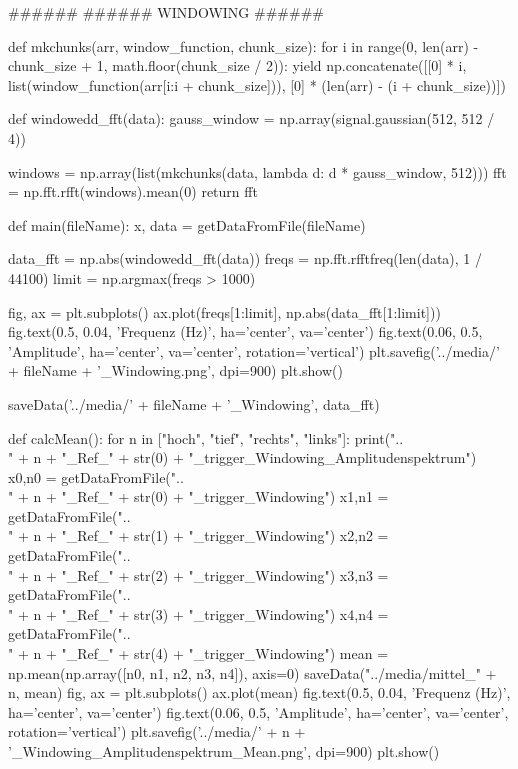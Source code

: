 ######
###### WINDOWING
######

def mkchunks(arr, window_function, chunk_size):
    for i in range(0, len(arr) - chunk_size + 1, math.floor(chunk_size / 2)):
        yield np.concatenate([[0] * i, list(window_function(arr[i:i + chunk_size])), [0] * (len(arr) - (i + chunk_size))])


def windowedd_fft(data):
    gauss_window = np.array(signal.gaussian(512, 512 / 4))

    windows = np.array(list(mkchunks(data, lambda d: d * gauss_window, 512)))
    fft = np.fft.rfft(windows).mean(0)
    return fft


def main(fileName):
    x, data = getDataFromFile(fileName)

    data_fft = np.abs(windowedd_fft(data))
    freqs = np.fft.rfftfreq(len(data), 1 / 44100)
    limit = np.argmax(freqs > 1000)

    fig, ax = plt.subplots()
    ax.plot(freqs[1:limit], np.abs(data_fft[1:limit]))
    fig.text(0.5, 0.04, 'Frequenz (Hz)', ha='center', va='center')
    fig.text(0.06, 0.5, 'Amplitude', ha='center', va='center', rotation='vertical')
    plt.savefig('../media/' + fileName + '_Windowing.png', dpi=900)
    plt.show()

    saveData('../media/' + fileName + '_Windowing', data_fft)

def calcMean():
    for n in ["hoch", "tief", "rechts", "links"]:
        print("..\media\Sprachinput\Ref\\" + n + "_Ref_" + str(0) + "_trigger_Windowing_Amplitudenspektrum")
        x0,n0 = getDataFromFile("..\media\Sprachinput\Ref\\" + n + "_Ref_" + str(0) + "_trigger_Windowing")
        x1,n1 = getDataFromFile("..\media\Sprachinput\Ref\\" + n + "_Ref_" + str(1) + "_trigger_Windowing")
        x2,n2 = getDataFromFile("..\media\Sprachinput\Ref\\" + n + "_Ref_" + str(2) + "_trigger_Windowing")
        x3,n3 = getDataFromFile("..\media\Sprachinput\Ref\\" + n + "_Ref_" + str(3) + "_trigger_Windowing")
        x4,n4 = getDataFromFile("..\media\Sprachinput\Ref\\" + n + "_Ref_" + str(4) + "_trigger_Windowing")
        mean = np.mean(np.array([n0, n1, n2, n3, n4]), axis=0)
        saveData("../media/mittel_" + n, mean)
        fig, ax = plt.subplots()
        ax.plot(mean)
        fig.text(0.5, 0.04, 'Frequenz (Hz)', ha='center', va='center')
        fig.text(0.06, 0.5, 'Amplitude', ha='center', va='center', rotation='vertical')
        plt.savefig('../media/' + n + '_Windowing_Amplitudenspektrum_Mean.png', dpi=900)
        plt.show()


